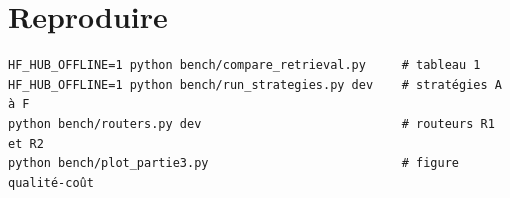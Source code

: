\documentclass[11pt,a4paper]{article}
\begin{document}
\appendix
\section{Reproduire}
\begin{small}
\begin{verbatim}
HF_HUB_OFFLINE=1 python bench/compare_retrieval.py     # tableau 1
HF_HUB_OFFLINE=1 python bench/run_strategies.py dev    # stratégies A à F
python bench/routers.py dev                            # routeurs R1 et R2
python bench/plot_partie3.py                           # figure qualité-coût
\end{verbatim}
\end{small}



\end{document}
